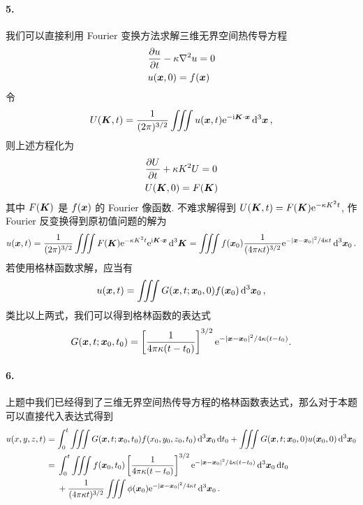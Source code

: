 \documentclass[12pt]{article}
\begin{document}
\paragraph{5.}
我们可以直接利用 Fourier 变换方法求解三维无界空间热传导方程
\begin{align*}
	&\pdv{u}{t} - \kappa \laplacian{u} = 0\\
	&u(\vb*{x}, 0) = f(\vb*{x})
\end{align*}
令
\begin{equation*}
	U(\vb*{K}, t) = \frac{1}{(2\pi)^{3/2}} \iiint u(\vb*{x}, t) \mathrm{e}^{-\mathrm{i} \vb*{K} \cdot \vb*{x}} \dd[3]{\vb*{x}},
\end{equation*}
则上述方程化为
\begin{align*}
	&\pdv{U}{t} + \kappa K^2 U = 0 \\
	&U(\vb*{K}, 0) = F(\vb*{K})
\end{align*}
其中 $F(\vb*{K})$ 是 $f(\vb*{x})$ 的 Fourier 像函数.
不难求解得到 $U(\vb*{K}, t) = F(\vb*{K}) \mathrm{e}^{-\kappa K^2 t}$, 作 Fourier 反变换得到原初值问题的解为
\begin{equation*}
	u(\vb*{x}, t) = \frac{1}{(2\pi)^{3/2}} \iiint F(\vb*{K}) \mathrm{e}^{-\kappa K^2 t} \mathrm{e}^{\mathrm{i} \vb*{K} \cdot \vb*{x}} \dd[3]{\vb*{K}} = \iiint f(\vb*{x}_0) \frac{1}{(4\pi \kappa t)^{3/2}} \mathrm{e}^{-\abs{\vb*{x} - \vb*{x}_0}^2/4\kappa t} \dd[3]{\vb*{x}_0}.
\end{equation*}
若使用格林函数求解，应当有
\begin{equation*}
	u(\vb*{x}, t) = \iiint G(\vb*{x}, t; \vb*{x}_0, 0) f(\vb*{x}_0) \dd[3]{\vb*{x}_0},
\end{equation*}
类比以上两式，我们可以得到格林函数的表达式
\begin{equation*}
	G(\vb*{x}, t; \vb*{x}_0, t_0) = \left[\frac{1}{4\pi \kappa (t - t_0)}\right]^{3/2} \mathrm{e}^{-\abs{\vb*{x} - \vb*{x}_0}^2/4\kappa (t - t_0)}.
\end{equation*}

\paragraph{6.}
上题中我们已经得到了三维无界空间热传导方程的格林函数表达式，那么对于本题可以直接代入表达式得到
\begin{align*}
	u(x, y, z, t) &= \int_{0}^{t} \iiint G(\vb*{x}, t; \vb*{x}_0, t_0) f(x_0, y_0, z_0, t_0) \dd[3]{\vb*{x}_0} \dd{t_0} + \iiint G(\vb*{x}, t; \vb*{x}_0, 0) u(\vb*{x}_0, 0) \dd[3]{\vb*{x}_0} \\
	&= \begin{aligned}[t]
		&\int_{0}^{t} \iiint f(\vb*{x}_0, t_0) \left[\frac{1}{4\pi \kappa (t - t_0)}\right]^{3/2} \mathrm{e}^{-\abs{\vb*{x} - \vb*{x}_0}^2/4\kappa (t - t_0)} \dd[3]{\vb*{x}_0} \dd{t_0} \\
		&+ \frac{1}{(4\pi \kappa t)^{3/2}} \iiint \phi(\vb*{x}_0) \mathrm{e}^{-\abs{\vb*{x} - \vb*{x}_0}^2/4\kappa t} \dd[3]{\vb*{x}_0}.
	\end{aligned}
\end{align*}
\end{document}
